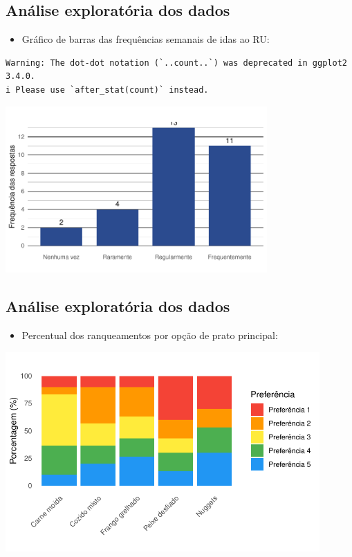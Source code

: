 \documentclass[
  letterpaper,
  DIV=11,
  numbers=noendperiod]{scrartcl}
\providecommand{\tightlist}{%
  \setlength{\itemsep}{0pt}\setlength{\parskip}{0pt}}\usepackage{longtable,booktabs,array}
\begin{document}
\subsection{Análise exploratória dos
dados}\label{anuxe1lise-exploratuxf3ria-dos-dados-1}

\begin{itemize}
\tightlist
\item
  Gráfico de barras das frequências semanais de idas ao RU:
\end{itemize}

\begin{verbatim}
Warning: The dot-dot notation (`..count..`) was deprecated in ggplot2 3.4.0.
i Please use `after_stat(count)` instead.
\end{verbatim}

\begin{center}
\includegraphics[width=0.75\textwidth,height=0.5\textheight]{PAGE-TEST-SLIDES_files/figure-pdf/unnamed-chunk-4-1.pdf}
\end{center}

\subsection{Análise exploratória dos
dados}\label{anuxe1lise-exploratuxf3ria-dos-dados-2}

\begin{itemize}
\tightlist
\item
  Percentual dos ranqueamentos por opção de prato principal:
\end{itemize}

\begin{center}
\includegraphics[width=0.9\textwidth,height=1\textheight]{PAGE-TEST-SLIDES_files/figure-pdf/unnamed-chunk-5-1.pdf}
\end{center}
\end{document}
